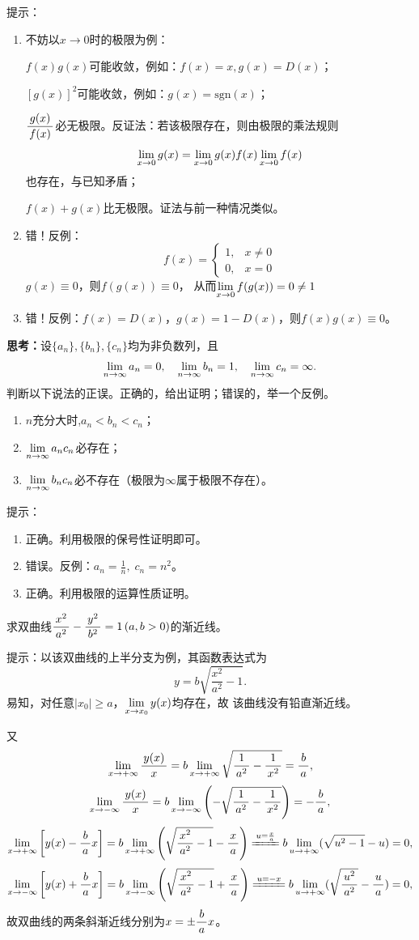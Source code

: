 \ifhint
提示：
\begin{enumerate}[(1)]
  \setlength{\itemindent}{1cm}
	\item 不妨以$x\to0$时的极限为例：

	\quad$f(x)g(x)$可能收敛，例如：$f(x)=x,g(x)=D(x)$；

	\quad$[g(x)]^2$可能收敛，例如：$g(x)=\mathrm{sgn}(x)$；

	\quad$\displaystyle\frac{\,{g(x)}\,}{\,{f(x)}\,}$必无极限。反证法：若该极限存在，则由极限的乘法规则
	$$\lim\limits_{x\to{0}}g(x)=\lim\limits_{x\to{0}}{g(x)}{f(x)}\lim\limits_{x\to{0}}f(x)$$
	也存在，与已知矛盾；

	\quad$f(x)+g(x)$比无极限。证法与前一种情况类似。
	\item 错！反例：
	$$f(x)=\left\{\begin{array}{ll}
	  1,&x\ne0\\0,&x=0
	\end{array}\right.$$
	\quad$g(x)\equiv 0$，则$f(g(x))\equiv0$，
	从而$\lim\limits_{x\to{0}}f(g(x))=0\ne 1$
	\item 错！反例：$f(x)=D(x)$，$g(x)=1-D(x)$，则$f(x)g(x)\equiv 0$。
	\fin
\end{enumerate}
\fi

\bs
{\bf 思考：}设$\{a_n\},\{b_n\},\{c_n\}$均为非负数列，且
  $$\lim\limits_{n\to\infty} a_n=0,\quad \lim\limits_{n\to\infty} b_n=1,\quad \lim\limits_{n\to\infty} c_n=\infty.$$
  判断以下说法的正误。正确的，给出证明；错误的，举一个反例。
  \begin{enumerate}[(1)]
  	\setlength{\itemindent}{1cm}
    \item $n$充分大时,$a_n<b_n<c_n$；
    \item $\lim\limits_{n\to\infty} a_nc_n$必存在；
    \item $\lim\limits_{n\to\infty} b_nc_n$必不存在（极限为$\infty$属于极限不存在）。
  \end{enumerate}

\ifhint
提示：
\begin{enumerate}[(1)]
	\setlength{\itemindent}{1cm}
	\item 正确。利用极限的保号性证明即可。
	\item 错误。反例：$a_n=\frac1n,\;c_n=n^2$。
	\item 正确。利用极限的运算性质证明。
\end{enumerate}
\fi

\bs
\egz 求双曲线$\displaystyle\frac{\,{x^2}\,}{\,{a^2}\,}-\displaystyle\frac{\,{y^2}\,}{\,{b^2}\,}=1\,(a,b>0)$的渐近线。

提示：以该双曲线的上半分支为例，其函数表达式为
$$y=b\sqrt{\frac{x^2}{a^2}-1}.$$
易知，对任意$|x_0|\geq a$，$\lim\limits_{x\to{x_0}}y(x)$均存在，故
该曲线没有铅直渐近线。

又
$$\lim\limits_{x\to{+\infty}}\displaystyle\frac{\,{y(x)}\,}{\,{x}\,}=b\lim\limits_{x\to{+\infty}}\sqrt{\displaystyle\frac{\,{1}\,}{\,{a^2}\,}-\displaystyle\frac{\,{1}\,}{\,{x^2}\,}}=\displaystyle\frac{\,{b}\,}{\,{a}\,},$$
$$\lim\limits_{x\to{-\infty}}\displaystyle\frac{\,{y(x)}\,}{\,{x}\,}=b\lim\limits_{x\to{-\infty}}\left(-\sqrt{\displaystyle\frac{\,{1}\,}{\,{a^2}\,}-\displaystyle\frac{\,{1}\,}{\,{x^2}\,}}\right)
=-\displaystyle\frac{\,{b}\,}{\,{a}\,},$$
$$\limx{+\infty}\left[y(x)-\df bax\right]
=b\limx{+\infty}\left(\sqrt{\df{x^2}{a^2}-1}-\df xa\right)
\xlongequal{u=\frac xa}b\lim\limits_{u\to+\infty}(\sqrt{u^2-1}-u)=0,$$
$$\limx{-\infty}\left[y(x)+\df bax\right]
=b\limx{-\infty}\left(\sqrt{\df{x^2}{a^2}-1}+\df xa\right)
\xlongequal{u=-x}b\lim\limits_{u\to+\infty}(\sqrt{\df{u^2}{a^2}}-\df ua)=0,$$
故双曲线的两条斜渐近线分别为$x=\pm\displaystyle\frac{\,{b}\,}{\,{a}\,}x$。


